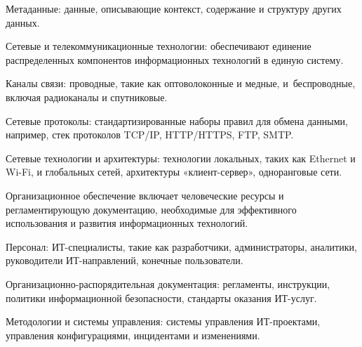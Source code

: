 \documentclass{ou}
\begin{document}
Метаданные: данные, описывающие контекст, содержание и структуру других данных.

Сетевые и телекоммуникационные технологии: обеспечивают единение распределенных компонентов информационных технологий в единую систему.

Каналы связи: проводные, такие как оптоволоконные и медные, и~беспроводные, включая радиоканалы и спутниковые.

Сетевые протоколы: стандартизированные наборы правил для обмена данными, например, стек протоколов TCP/IP, HTTP/HTTPS, FTP, SMTP.

Сетевые технологии и архитектуры: технологии локальных, таких как Ethernet и Wi-Fi, и глобальных сетей, архитектуры «клиент-сервер», одноранговые сети.

Организационное обеспечение включает человеческие ресурсы и регламентирующую документацию, необходимые для эффективного использования и развития информационных технологий.

Персонал: ИТ-специалисты, такие как разработчики, администраторы, аналитики, руководители ИТ-направлений, конечные пользователи.

Организационно-распорядительная документация: регламенты, инструкции, политики информационной безопасности, стандарты оказания ИТ-услуг.

Методологии и системы управления: системы управления ИТ-проектами, управления конфигурациями, инцидентами и изменениями.
\end{document}
